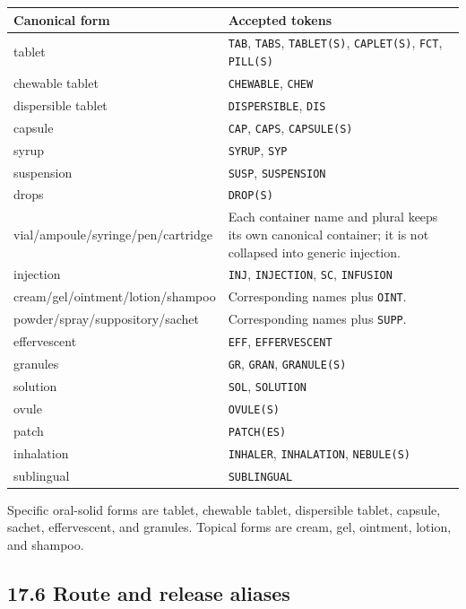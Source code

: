 {\def\LTcaptype{none} %
\begin{longtable}[]{@{}>{\RaggedRight\arraybackslash}p{.27\linewidth}>{\RaggedRight\arraybackslash}p{.66\linewidth}@{}}
\toprule\noalign{}
Canonical form & Accepted tokens \\
\midrule\noalign{}
\endhead
\bottomrule\noalign{}
\endlastfoot
tablet & \texttt{TAB}, \texttt{TABS}, \texttt{TABLET(S)}, \texttt{CAPLET(S)}, \texttt{FCT}, \texttt{PILL(S)} \\
chewable tablet & \texttt{CHEWABLE}, \texttt{CHEW} \\
dispersible tablet & \texttt{DISPERSIBLE}, \texttt{DIS} \\
capsule & \texttt{CAP}, \texttt{CAPS}, \texttt{CAPSULE(S)} \\
syrup & \texttt{SYRUP}, \texttt{SYP} \\
suspension & \texttt{SUSP}, \texttt{SUSPENSION} \\
drops & \texttt{DROP(S)} \\
vial/ampoule/syringe/pen/cartridge & Each container name and plural keeps its own canonical container; it is not collapsed into generic injection. \\
injection & \texttt{INJ}, \texttt{INJECTION}, \texttt{SC}, \texttt{INFUSION} \\
cream/gel/ointment/lotion/shampoo & Corresponding names plus \texttt{OINT}. \\
powder/spray/suppository/sachet & Corresponding names plus \texttt{SUPP}. \\
effervescent & \texttt{EFF}, \texttt{EFFERVESCENT} \\
granules & \texttt{GR}, \texttt{GRAN}, \texttt{GRANULE(S)} \\
solution & \texttt{SOL}, \texttt{SOLUTION} \\
ovule & \texttt{OVULE(S)} \\
patch & \texttt{PATCH(ES)} \\
inhalation & \texttt{INHALER}, \texttt{INHALATION}, \texttt{NEBULE(S)} \\
sublingual & \texttt{SUBLINGUAL} \\
\end{longtable}
}

Specific oral-solid forms are tablet, chewable tablet, dispersible tablet, capsule, sachet, effervescent, and granules. Topical forms are cream, gel, ointment, lotion, and shampoo.

\subsection{17.6 Route and release aliases}\label{176-route-and-release-aliases}

